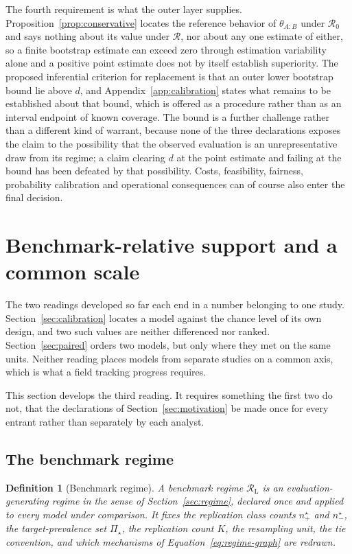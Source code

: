 \documentclass[11pt]{article}
\newcommand{\Regime}{\mathcal{R}}
\newcommand{\PSet}{\Pi_\star}
\newcommand{\RegimeL}{\Regime_{\mathrm{L}}}
\newtheorem{definition}{Definition}
\theoremstyle{remark}
\begin{document}
The fourth requirement is what the outer layer supplies. Proposition~\ref{prop:conservative} locates the reference behavior of $\theta_{A:B}$ under $\Regime_0$ and says nothing about its value under $\Regime$, nor about any one estimate of either, so a finite bootstrap estimate can exceed zero through estimation variability alone and a positive point estimate does not by itself establish superiority. The proposed inferential criterion for replacement is that an outer lower bootstrap bound lie above $d$, and Appendix~\ref{app:calibration} states what remains to be established about that bound, which is offered as a procedure rather than as an interval endpoint of known coverage. The bound is a further challenge rather than a different kind of warrant, because none of the three declarations exposes the claim to the possibility that the observed evaluation is an unrepresentative draw from its regime; a claim clearing $d$ at the point estimate and failing at the bound has been defeated by that possibility. Costs, feasibility, fairness, probability calibration and operational consequences can of course also enter the final decision.


\section{Benchmark-relative support and a common scale}
\label{sec:leaderboard}

The two readings developed so far each end in a number belonging to one study. Section~\ref{sec:calibration} locates a model against the chance level of its own design, and two such values are neither differenced nor ranked. Section~\ref{sec:paired} orders two models, but only where they met on the same units. Neither reading places models from separate studies on a common axis, which is what a field tracking progress requires.

This section develops the third reading. It requires something the first two do not, that the declarations of Section~\ref{sec:motivation} be made once for every entrant rather than separately by each analyst.

\subsection{The benchmark regime}
\label{sec:benchmark-regime}

\begin{definition}[Benchmark regime]
\label{def:benchmark-regime}
A benchmark regime $\RegimeL$ is an evaluation-generating regime in the sense of Section~\ref{sec:regime}, declared once and applied to every model under comparison. It fixes the replication class counts $n^\star_+$ and $n^\star_-$, the target-prevalence set $\PSet$, the replication count $K$, the resampling unit, the tie convention, and which mechanisms of Equation~\eqref{eq:regime-graph} are redrawn.
\end{definition}
\end{document}
